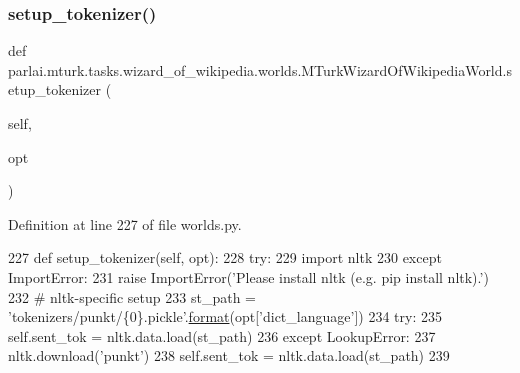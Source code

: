 \subsubsection{\texorpdfstring{setup\+\_\+tokenizer()}{setup\_tokenizer()}}
{\footnotesize\ttfamily def parlai.\+mturk.\+tasks.\+wizard\+\_\+of\+\_\+wikipedia.\+worlds.\+M\+Turk\+Wizard\+Of\+Wikipedia\+World.\+setup\+\_\+tokenizer (\begin{DoxyParamCaption}\item[{}]{self,  }\item[{}]{opt }\end{DoxyParamCaption})}



Definition at line 227 of file worlds.\+py.


\begin{DoxyCode}
227     \textcolor{keyword}{def }setup\_tokenizer(self, opt):
228         \textcolor{keywordflow}{try}:
229             \textcolor{keyword}{import} nltk
230         \textcolor{keywordflow}{except} ImportError:
231             \textcolor{keywordflow}{raise} ImportError(\textcolor{stringliteral}{'Please install nltk (e.g. pip install nltk).'})
232         \textcolor{comment}{# nltk-specific setup}
233         st\_path = \textcolor{stringliteral}{'tokenizers/punkt/\{0\}.pickle'}.\hyperlink{namespaceparlai_1_1chat__service_1_1services_1_1messenger_1_1shared__utils_a32e2e2022b824fbaf80c747160b52a76}{format}(opt[\textcolor{stringliteral}{'dict\_language'}])
234         \textcolor{keywordflow}{try}:
235             self.sent\_tok = nltk.data.load(st\_path)
236         \textcolor{keywordflow}{except} LookupError:
237             nltk.download(\textcolor{stringliteral}{'punkt'})
238             self.sent\_tok = nltk.data.load(st\_path)
239 
\end{DoxyCode}
\mbox{\label{classparlai_1_1mturk_1_1tasks_1_1wizard__of__wikipedia_1_1worlds_1_1MTurkWizardOfWikipediaWorld_ae83f8e16372c0d18ceda5a2de734d146}} 

